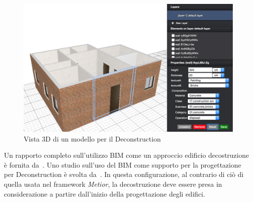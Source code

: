 \begin{figure}[htbp] %
   \centering
   \includegraphics[width=1\linewidth]{images/3d-sel}
   \caption{Vista 3D di un modello per il Deconstruction}
   \label{fig:augmented}
\end{figure}

Un rapporto completo sull'utilizzo BIM come un approccio edificio decostruzione è fornita da~\cite{galic2014bim}.
Uno studio sull'uso del BIM come supporto per la progettazione per Deconstruction è svolta da~\cite{akinade2015waste}.
In questa configurazione, al contrario di ciò di quella usata nel framework \emph{Metior}, la decostruzione deve essere
presa in considerazione a partire dall'inizio della progettazione degli edifici.
\newpage



